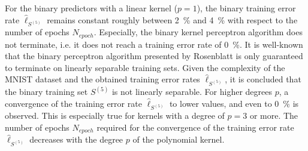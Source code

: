 For the binary predictors with a linear kernel ($p=1$), the binary training error rate $\hat{\ell}_{S^{(5)}}$ remains constant roughly between \SI{2}{\percent} and \SI{4}{\percent} with respect to the number of epochs $N_{epoch}$. Especially, the binary kernel perceptron algorithm does not terminate, i.e. it does not reach a training error rate of \SI{0}{\percent}. It is well-known that the binary perceptron algorithm presented by Rosenblatt is only guaranteed to terminate on linearly separable training sets. Given the complexity of the MNIST dataset and the obtained training error rates $\hat{\ell}_{S^{(5)}}$, it is concluded that the binary training set $S^{(5)}$ is not linearly separable. For higher degrees $p$, a convergence of the training error rate $\hat{\ell}_{S^{(5)}}$ to lower values, and even to \SI{0}{\percent} is observed. This is especially true for kernels with a degree of $p=3$ or more. The number of epochs $N_{epoch}$ required for the convergence of the training error rate $\hat{\ell}_{S^{(5)}}$ decreases with the degree $p$ of the polynomial kernel.

